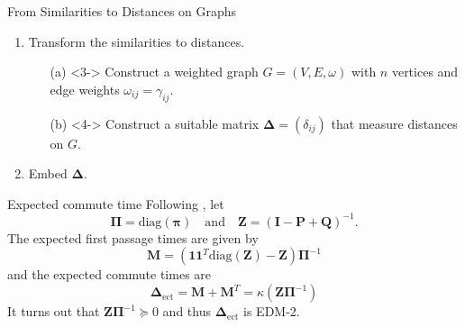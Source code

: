 \documentclass[professionalfonts,hyperref={pdfpagelabels=false,colorlinks=true,linkcolor=red}]{beamer}
\begin{document}
\begin{frame}{From Similarities to Distances on Graphs}
  \begin{enumerate}
  \item<2-> Transform the similarities to distances.
    \begin{enumerate}
    \item[(a)]<3-> Construct a weighted graph $G = (V,E,\omega)$ with $n$
      vertices and edge weights $\omega_{ij} = \gamma_{ij}$.
    \item[(b)]<4-> Construct a suitable matrix $\bm{\Delta} = (\delta_{ij})$
      that measure distances on $G$. 
    \end{enumerate}
  \item<5-> Embed $\bm{\Delta}$. 
  \end{enumerate}
\end{frame}
\begin{frame}{Expected commute time}
  Following \cite{kemeny83:_finit_markov_chain}, let
  \begin{equation*}
    \bm{\Pi} = \mathrm{diag}(\bm{\pi}) \quad \text{and} \quad
    \mathbf{Z} = (\mathbf{I} - \mathbf{P} + \mathbf{Q})^{-1}.
  \end{equation*}
  The expected first passage times are given by
  \begin{equation*}
    \mathbf{M} = (\mathbf{1}\mathbf{1}^{T}\mathrm{diag}(\mathbf{Z}) -
    \mathbf{Z})\bm{\Pi}^{-1} 
  \end{equation*}
  and the expected commute times are
  \begin{equation*}
    \bm{\Delta}_{\mathrm{ect}} = \mathbf{M} + \mathbf{M}^{T} =
    \kappa(\mathbf{Z}\bm{\Pi}^{-1})
  \end{equation*}
  It turns out that $\mathbf{Z}\bm{\Pi}^{-1} \succeq 0$ and thus
  $\bm{\Delta}_{\mathrm{ect}}$ is EDM-2.
\end{frame}
\end{document}
